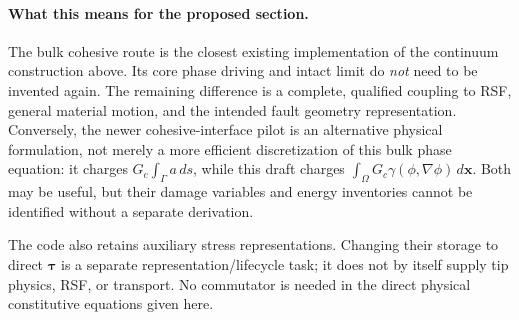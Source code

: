 \documentclass[10pt,a4paper]{article}
\begin{document}
\paragraph{What this means for the proposed section.}
The bulk cohesive route is the closest existing implementation of the
continuum construction above. Its core phase driving and intact limit do
\emph{not} need to be invented again. The remaining difference is a complete,
qualified coupling to RSF, general material motion, and the intended fault
geometry representation. Conversely, the newer cohesive-interface pilot is
an alternative physical formulation, not merely a more efficient discretization
of this bulk phase equation: it charges $G_c\int_\Gamma a\,ds$, while this
draft charges $\int_\Omega G_c\gamma(\phi,\nabla\phi)\,d\bm x$.
Both may be useful, but their damage variables and energy inventories cannot
be identified without a separate derivation.

The code also retains auxiliary stress representations. Changing their storage
to direct $\bm\tau$ is a separate representation/lifecycle task; it does not
by itself supply tip physics, RSF, or transport. No commutator is needed in
the direct physical constitutive equations given here.
\end{document}
